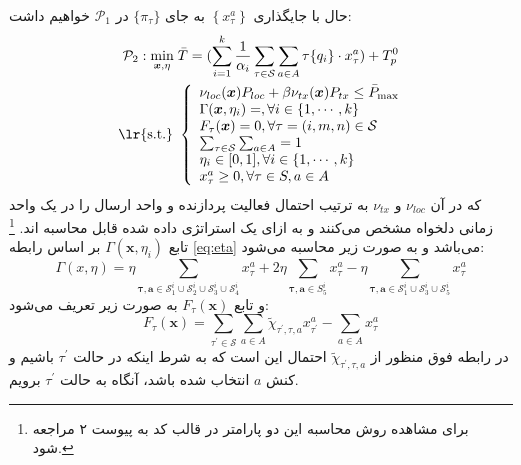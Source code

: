 حال با جایگذاری $\left\{x_{\tau}^{a}\right\}$ به جای $\{\pi_\tau\}$ در
$\mathcal{P}_{1}$
خواهیم داشت:
\begin{equation}
	\label{eq:p2}
	\begin{aligned}
		\mathcal{P}_{2}: \min _{\boldsymbol{x}, \eta}\; & \bar{T}=(\sum_{i=1}^{k} \frac{1}{\alpha_i} \sum_{\tau \in \mathcal{S}} \sum_{a \in A} \tau\{q_i\} \cdot x_{\tau}^{a})+ T_p^0 \\
		\text { \lr{s.t.} } &\left\{\begin{array}{l}
			\nu_{l o c}(\boldsymbol{x}) P_{l o c}+\beta \nu_{t x}(\boldsymbol{x}) P_{t x} \leq \bar{P}_{\max } \\
			\Gamma(\boldsymbol{x}, \eta_i)=, \forall i \in \{1, \cdots, k\}\\
			F_{\tau}(\boldsymbol{x})=0, \forall \tau=(i, m, n) \in \mathcal{S} \\
			\sum_{\tau \in \mathcal{S}} \sum_{a \in A}=1 \\
			\eta_i \in [0, 1], \forall i \in \{1, \cdots, k\} \\
			x_{\tau}^{a} \geq 0, \forall \tau \in S, a \in A
		\end{array}\right.
	\end{aligned}
\end{equation}
که در آن
$\nu_{l o c}$
و
$\nu_{t x}$
به ترتیب احتمال فعالیت پردازنده و واحد ارسال را در یک واحد زمانی دلخواه مشخص می‌کنند و به ازای یک استراتژی داده شده قابل محاسبه اند. \footnote{برای مشاهده روش محاسبه این دو پارامتر در قالب کد به پیوست ۲ مراجعه شود.} تابع
$\Gamma(\boldsymbol{x}, \eta_i)$
بر اساس رابطه \ref{eq:eta} می‌باشد و به صورت زیر محاسبه می‌شود:
\begin{equation}
	\Gamma(x, \eta) = \eta  \sum_{\boldsymbol{\tau, a} \in \mathcal{S}_{1}^i\cup\mathcal{S}_{2}^i\cup\mathcal{S}_{3}^i\cup\mathcal{S}_{4}^i} x_{\tau}^a + 2 \eta \sum_{\boldsymbol{\tau, a} \in S_5^i} x_{\tau}^a
	- \eta \sum_{\boldsymbol{\tau, a} \in \mathcal{S}_{1}^i\cup\mathcal{S}_{3}^i\cup\mathcal{S}_{5}^i} x_{\tau}^a
\end{equation}
و تابع 
$F_{\tau}(\boldsymbol{x})$
به صورت زیر تعریف می‌شود:
\begin{equation}
	F_{\tau}(\boldsymbol{x})=\sum_{\tau^{\prime} \in \mathcal{S}} \sum_{a \in A} \tilde{\chi}_{\tau^{\prime}, \tau, a} x_{\tau^{\prime}}^{a}-\sum_{a \in A} x_{\tau}^{a}
\end{equation}
در رابطه فوق منظور از
$ \tilde{\chi}_{\tau^{\prime}, \tau, a}$
احتمال این است که به شرط اینکه در حالت
$\tau^{\prime}$
باشیم و کنش
$a$
انتخاب شده باشد، آنگاه به حالت
$\tau^{\prime}$
برویم. \\

